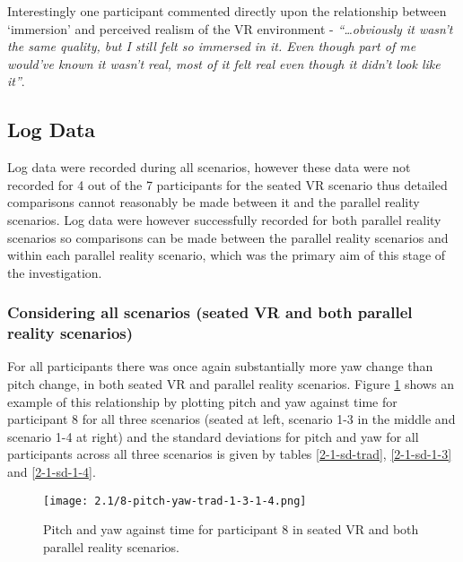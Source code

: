 Interestingly one participant commented directly upon the relationship between `immersion' and perceived realism of the VR environment - \textit{``\ldots obviously it wasn't the same quality, but I still felt so immersed in it. Even though part of me would've known it wasn't real, most of it felt real even though it didn't look like it''}.


\subsection{Log Data}
\label{2-1-log-data}

Log data were recorded during all scenarios, however these data were not recorded for 4 out of the 7 participants for the seated VR scenario thus detailed comparisons cannot reasonably be made between it and the parallel reality scenarios. Log data were however successfully recorded for both parallel reality scenarios so comparisons can be made between the parallel reality scenarios and within each parallel reality scenario, which was the primary aim of this stage of the investigation.


\subsubsection{Considering all scenarios (seated VR and both parallel reality scenarios)}

For all participants there was once again substantially more yaw change than pitch change, in both seated VR and parallel reality scenarios. Figure \ref{2-1-8-pitch-yaw-trad-1-3-1-4.png} shows an example of this relationship by plotting pitch and yaw against time for participant 8 for all three scenarios (seated at left, scenario 1-3 in the middle and scenario 1-4 at right) and the standard deviations for pitch and yaw for all participants across all three scenarios is given by tables \ref{2-1-sd-trad}, \ref{2-1-sd-1-3} and \ref{2-1-sd-1-4}.

\begin{figure}[h]
	\begin{center}
	\texttt{[image: 2.1/8-pitch-yaw-trad-1-3-1-4.png]}
	\caption{Pitch and yaw against time for participant 8 in seated VR and both parallel reality scenarios.}
	\label{2-1-8-pitch-yaw-trad-1-3-1-4.png}
	\end{center}
\end{figure}

